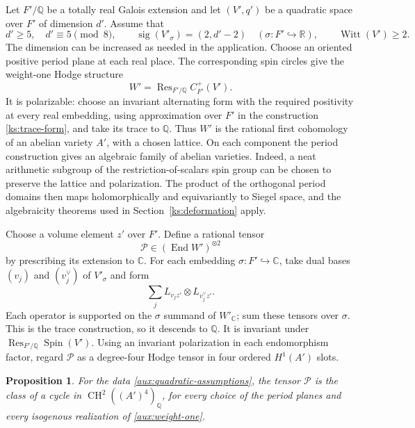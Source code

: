 \documentclass[11pt]{article}
\numberwithin{equation}{section}
\newtheorem{proposition}[theorem]{Proposition}
\theoremstyle{definition}
\theoremstyle{remark}
\begin{document}
Let $F'/\mathbb Q$ be a totally real Galois extension and let
$(V',q')$ be a quadratic space over $F'$ of dimension $d'$.
Assume that
\begin{equation}
 \label{aux:quadratic-assumptions}
 d'\ge5,\quad d'\equiv5\pmod8,\qquad
 \operatorname{sig}(V'_\sigma)=(2,d'-2)
       \quad(\sigma:F'\hookrightarrow\mathbb R),\qquad
 \operatorname{Witt}(V')\ge2.
\end{equation}
The dimension can be increased as needed in the
application.  Choose an
oriented positive period plane at each real place.  The
corresponding spin circles give the weight-one Hodge
structure
\begin{equation}
 \label{aux:weight-one}
 W'=\operatorname{Res}_{F'/\mathbb Q}C^+_{F'}(V').
\end{equation}
It is polarizable: choose an invariant alternating form
with the required positivity at every real embedding,
using approximation over $F'$ in the construction
\eqref{ks:trace-form}, and take its trace to $\mathbb Q$.
Thus $W'$ is the rational first cohomology of an abelian
variety $A'$, with a chosen lattice.  On each component
the period construction gives an algebraic family of
abelian varieties.  Indeed, a neat arithmetic subgroup
of the restriction-of-scalars spin group can be chosen
to preserve the lattice and polarization.  The product
of the orthogonal period domains then maps
holomorphically and equivariantly to Siegel space, and
the algebraicity theorems used in
Section~\ref{ks:deformation} apply.

Choose a volume element $z'$ over $F'$.  Define a
rational tensor
\begin{equation}
 \label{aux:P}
 \mathcal P\in(\operatorname{End} W')^{\otimes2}
\end{equation}
by prescribing its extension to $\mathbb C$.  For each embedding
$\sigma:F'\hookrightarrow\mathbb C$, take dual bases
$(v_j)$ and $(v_j^\vee)$ of $V'_\sigma$ and form
\[
 \sum_jL_{v_jz'}\otimes L_{v_j^\vee z'}.
\]
Each operator is supported on the $\sigma$ summand of
$W'_\mathbb C$; sum these tensors over $\sigma$.  This is the
trace construction, so it descends to $\mathbb Q$.  It is
invariant under $\operatorname{Res}_{F'/\mathbb Q}\operatorname{Spin}(V')$.
Using an invariant polarization in each endomorphism
factor, regard $\mathcal P$ as a degree-four Hodge
tensor in four ordered $H^1(A')$ slots.

\begin{proposition}
 \label{prop:auxiliary-spin}
For the data \eqref{aux:quadratic-assumptions}, the tensor
$\mathcal P$ is the class of a cycle in
$\operatorname{CH}^2((A')^4)_{\mathbb Q}$, for every choice of the period planes and
every isogenous realization of \eqref{aux:weight-one}.
\end{proposition}
\end{document}
